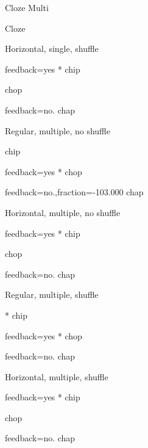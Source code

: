 \documentclass{article}
\begin{document}
\begin{quiz}{Cloze Multi}
\begin{cloze}{Cloze}
\begin{multi}[shuffle=true,horizontal]
	Horizontal, single, shuffle
	\item[feedback={yes}]* chip
	\item chop
	\item[feedback={no.}] chap
\end{multi}

\begin{multi}[multiple,shuffle=false]
	Regular, multiple, no shuffle
	\item* chip
	\item[feedback={yes}]* chop
	\item[feedback={no.},fraction=-103.000] chap
\end{multi}

\begin{multi}[multiple,shuffle=false,horizontal]
	Horizontal, multiple, no shuffle
	\item[feedback={yes}]* chip
	\item* chop
	\item[feedback={no.}] chap
\end{multi}

\begin{multi}[multiple,shuffle=true]
	Regular, multiple, shuffle
	\item[]* chip
	\item[feedback={yes}]* chop
	\item[feedback={no.}] chap
\end{multi}

\begin{multi}[multiple,shuffle=true,horizontal]
	Horizontal, multiple, shuffle
	\item[feedback={yes}]* chip
	\item* chop
	\item[feedback={no.}] chap
\end{multi}
\end{cloze}
\end{quiz}
\end{document}
